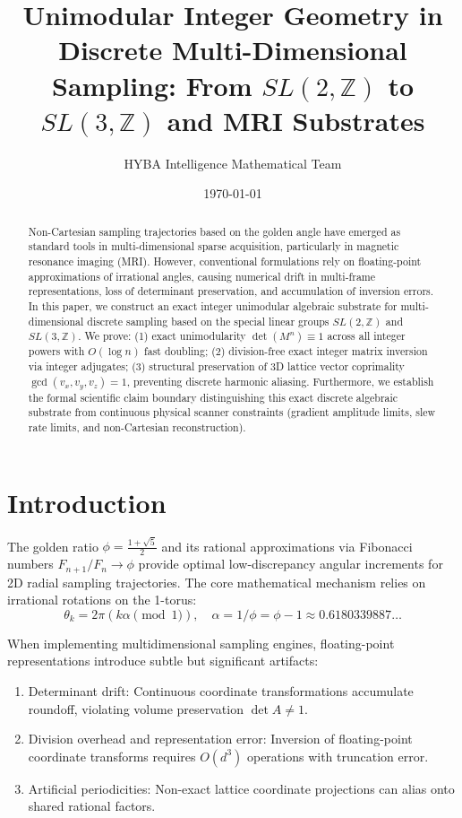 \documentclass{article}
\title{Unimodular Integer Geometry in Discrete Multi-Dimensional Sampling: From $SL(2,\mathbb{Z})$ to $SL(3,\mathbb{Z})$ and MRI Substrates}
\author{HYBA Intelligence Mathematical Team}
\date{\today}
\theoremstyle{remark}
\begin{document}
\maketitle

\begin{abstract}
Non-Cartesian sampling trajectories based on the golden angle have emerged as standard tools in multi-dimensional sparse acquisition, particularly in magnetic resonance imaging (MRI). However, conventional formulations rely on floating-point approximations of irrational angles, causing numerical drift in multi-frame representations, loss of determinant preservation, and accumulation of inversion errors. In this paper, we construct an exact integer unimodular algebraic substrate for multi-dimensional discrete sampling based on the special linear groups $SL(2,\mathbb{Z})$ and $SL(3,\mathbb{Z})$. We prove: (1) exact unimodularity $\det(M^n) \equiv 1$ across all integer powers with $O(\log n)$ fast doubling; (2) division-free exact integer matrix inversion via integer adjugates; (3) structural preservation of 3D lattice vector coprimality $\gcd(v_x, v_y, v_z) = 1$, preventing discrete harmonic aliasing. Furthermore, we establish the formal scientific claim boundary distinguishing this exact discrete algebraic substrate from continuous physical scanner constraints (gradient amplitude limits, slew rate limits, and non-Cartesian reconstruction).
\end{abstract}

\section{Introduction}

The golden ratio $\phi = \frac{1+\sqrt{5}}{2}$ and its rational approximations via Fibonacci numbers $F_{n+1}/F_n \to \phi$ provide optimal low-discrepancy angular increments for 2D radial sampling trajectories. The core mathematical mechanism relies on irrational rotations on the 1-torus:
\[
\theta_k = 2\pi (k\alpha \pmod 1), \quad \alpha = 1/\phi = \phi - 1 \approx 0.6180339887\dots
\]

When implementing multidimensional sampling engines, floating-point representations introduce subtle but significant artifacts:
\begin{enumerate}
    \item Determinant drift: Continuous coordinate transformations accumulate roundoff, violating volume preservation $\det A \neq 1$.
    \item Division overhead and representation error: Inversion of floating-point coordinate transforms requires $O(d^3)$ operations with truncation error.
    \item Artificial periodicities: Non-exact lattice coordinate projections can alias onto shared rational factors.
\end{enumerate}
\end{document}
